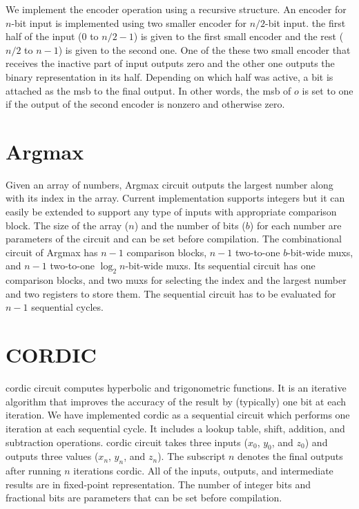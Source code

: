 We implement the encoder operation using a recursive structure.
An encoder for $n$-bit input is implemented using two smaller encoder for $n/2$-bit input.
the first half of the input ($0$ to $n/2-1$) is given to the first small encoder and the rest ($n/2$ to $n-1$) is given to the second one.
One of the these two small encoder that receives the inactive part of input outputs zero and the other one outputs the binary representation in its half.
Depending on which half was active, a bit is attached as the \acrfull{msb} to the final output.
In other words, the \acrshort{msb} of $o$ is set to one if the output of the second encoder is nonzero and otherwise zero.

\section{Argmax}
Given an array of numbers, Argmax circuit outputs the largest number along with its index in the array.
Current implementation supports integers but it can easily be extended to support any type of inputs with appropriate comparison block.
The size of the array ($n$) and the number of bits ($b$) for each number are parameters of the circuit and can be set before compilation.
The combinational circuit of Argmax has $n-1$ comparison blocks, $n-1$ two-to-one $b$-bit-wide \acrshort{mux}s, and $n-1$ two-to-one $\log_2{n}$-bit-wide \acrshort{mux}s.
Its sequential circuit has one comparison blocks, and two \acrshort{mux}s for selecting the index and the largest number and two registers to store them.
The sequential circuit has to be evaluated for $n-1$ sequential cycles.

\section{CORDIC}
\acrfull{cordic} circuit computes hyperbolic and trigonometric functions.
It is an iterative algorithm that improves the accuracy of the result by (typically) one bit at each iteration.
We have implemented \acrshort{cordic} as a sequential circuit which performs one iteration at each sequential cycle.
It includes a lookup table, shift, addition, and subtraction operations.
\acrshort{cordic} circuit takes three inputs ($x_0$, $y_0$, and $z_0$) and outputs three values ($x_n$, $y_n$, and $z_n$).
The subscript $n$ denotes the final outputs after running $n$ iterations \acrshort{cordic}.
All of the inputs, outputs, and intermediate results are in fixed-point representation.
The number of integer bits and fractional bits are parameters that can be set before compilation.


